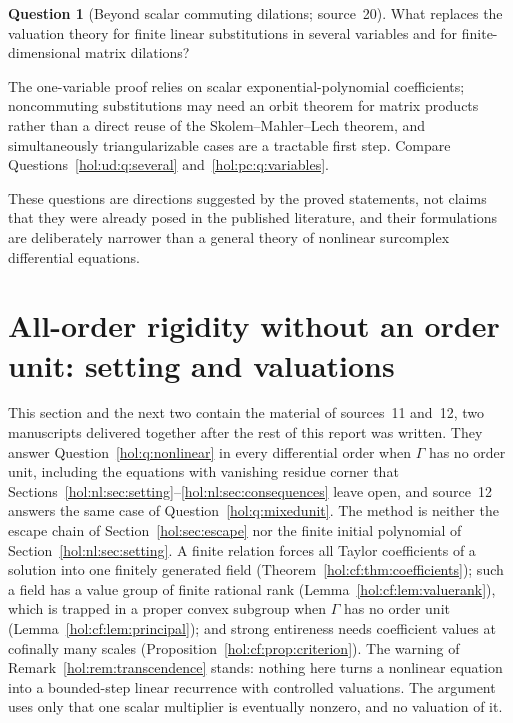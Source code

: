 \documentclass[11pt]{article}
\numberwithin{equation}{section}
\theoremstyle{definition}
\newtheorem{question}[theorem]{Question}
\theoremstyle{remark}
\begin{document}
\begin{question}[Beyond scalar commuting dilations; source~20]
\label{hol:rc:q:substitutions}
What replaces the valuation theory for finite linear substitutions in several
variables and for finite-dimensional matrix dilations?
\end{question}

The one-variable proof relies on scalar exponential-polynomial coefficients;
noncommuting substitutions may need an orbit theorem for matrix products
rather than a direct reuse of the Skolem--Mahler--Lech theorem, and
simultaneously triangularizable cases are a tractable first step. Compare
Questions~\ref{hol:ud:q:several} and~\ref{hol:pc:q:variables}.

These questions are directions suggested by the proved statements, not claims
that they were already posed in the published literature, and their
formulations are deliberately narrower than a general theory of nonlinear
surcomplex differential equations.

\section{All-order rigidity without an order unit: setting and valuations}
\label{hol:cf:sec:setting}

This section and the next two contain the material of sources~11 and~12,
two manuscripts delivered together after the rest of this report was
written. They answer Question~\ref{hol:q:nonlinear} in every differential
order when $\Gamma$ has no order unit, including the equations with vanishing
residue corner that Sections~\ref{hol:nl:sec:setting}--\ref{hol:nl:sec:consequences}
leave open, and source~12 answers the same case of
Question~\ref{hol:q:mixedunit}. The method is neither the escape chain of
Section~\ref{hol:sec:escape} nor the finite initial polynomial of
Section~\ref{hol:nl:sec:setting}. A finite relation forces all Taylor
coefficients of a solution into one finitely generated field
(Theorem~\ref{hol:cf:thm:coefficients}); such a field has a value group of
finite rational rank (Lemma~\ref{hol:cf:lem:valuerank}), which is trapped in a
proper convex subgroup when $\Gamma$ has no order unit
(Lemma~\ref{hol:cf:lem:principal}); and strong entireness needs coefficient
values at cofinally many scales (Proposition~\ref{hol:cf:prop:criterion}).
The warning of Remark~\ref{hol:rem:transcendence} stands: nothing here turns
a nonlinear equation into a bounded-step linear recurrence with controlled
valuations. The argument uses only that one scalar multiplier is eventually
nonzero, and no valuation of it.
\end{document}
